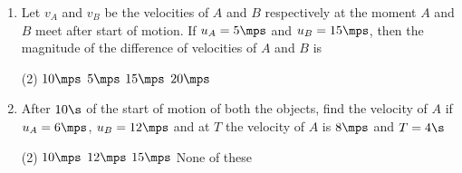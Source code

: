 \documentclass{article}
\renewcommand{\ans}{\quad}
\begin{document}
\begin{enumerate}
    \item Let $v_A$ and $v_B$ be the velocities of $A$ and $B$ respectively at the moment $A$ and $B$ meet after start of motion.  If $u_A=5\mps$ and $u_B=15\mps$, then the magnitude of the difference of velocities of $A$ and $B$ is
    \begin{tasks}(2)
        \task $10\mps$\ans
        \task $5\mps$
        \task $15\mps$
        \task $20\mps$
    \end{tasks}

    \item After $10\s$ of the start of motion of both the objects, find the velocity of $A$ if $u_A=6\mps$, $u_B=12\mps$ and at $T$ the velocity of $A$ is $8\mps$ and $T=4\s$
    \begin{tasks}(2)
        \task $10\mps$
        \task $12\mps$
        \task $15\mps$
        \task None of these \ans
    \end{tasks}

    



\end{enumerate}


\pagebreak


\end{document}
